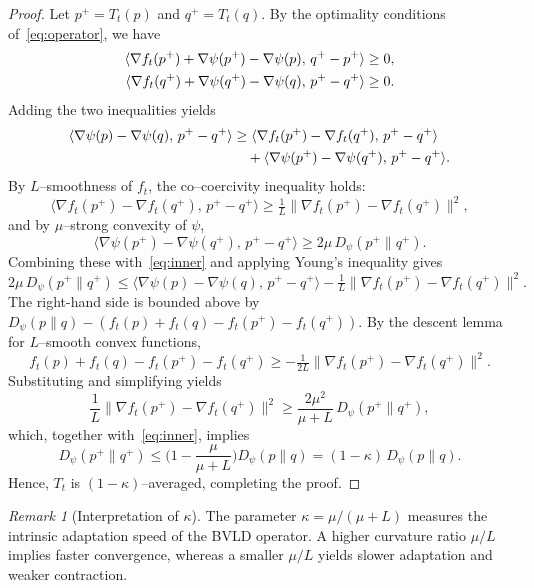 \documentclass[11pt]{article}
\theoremstyle{plain}
\theoremstyle{definition}
\theoremstyle{remark}
\newtheorem{remark}[theorem]{Remark}
\begin{document}
\begin{proof}
Let $p^+=T_t(p)$ and $q^+=T_t(q)$.  
By the optimality conditions of~\eqref{eq:operator}, we have
\begin{align}
\langle\nabla f_t(p^+)+\nabla\psi(p^+)-\nabla\psi(p),\,q^+-p^+\rangle &\ge 0, \notag\\
\langle\nabla f_t(q^+)+\nabla\psi(q^+)-\nabla\psi(q),\,p^+-q^+\rangle &\ge 0. 
\label{eq:opt-conditions}
\end{align}
Adding the two inequalities yields
\begin{align}
\langle\nabla\psi(p)-\nabla\psi(q),\,p^+-q^+\rangle
&\ge
\langle\nabla f_t(p^+)-\nabla f_t(q^+),\,p^+-q^+\rangle \notag\\
&\quad
+\langle\nabla\psi(p^+)-\nabla\psi(q^+),\,p^+-q^+\rangle.
\label{eq:inner}
\end{align}
By $L$--smoothness of $f_t$, the co--coercivity inequality holds:
\[
\langle\nabla f_t(p^+)-\nabla f_t(q^+),\,p^+-q^+\rangle
\ge \tfrac{1}{L}\|\nabla f_t(p^+)-\nabla f_t(q^+)\|^2,
\]
and by $\mu$--strong convexity of $\psi$,
\[
\langle\nabla\psi(p^+)-\nabla\psi(q^+),\,p^+-q^+\rangle
\ge 2\mu\,D_\psi(p^+\|q^+).
\]
Combining these with~\eqref{eq:inner} and applying Young’s inequality gives
\[
2\mu\,D_\psi(p^+\|q^+)
\le
\langle\nabla\psi(p)-\nabla\psi(q),\,p^+-q^+\rangle
-\tfrac{1}{L}\|\nabla f_t(p^+)-\nabla f_t(q^+)\|^2.
\]
The right-hand side is bounded above by 
$D_\psi(p\|q)-(f_t(p)+f_t(q)-f_t(p^+)-f_t(q^+))$.
By the descent lemma for $L$--smooth convex functions,
\[
f_t(p)+f_t(q)-f_t(p^+)-f_t(q^+)
\ge -\tfrac{1}{2L}\|\nabla f_t(p^+)-\nabla f_t(q^+)\|^2.
\]
Substituting and simplifying yields
\[
\frac{1}{L}\|\nabla f_t(p^+)-\nabla f_t(q^+)\|^2
\ge \frac{2\mu^2}{\mu+L}\,D_\psi(p^+\|q^+),
\]
which, together with~\eqref{eq:inner}, implies
\[
D_\psi(p^+\|q^+)
\le \Big(1-\frac{\mu}{\mu+L}\Big)D_\psi(p\|q)
=(1-\kappa)\,D_\psi(p\|q).
\]
Hence, $T_t$ is $(1-\kappa)$--averaged, completing the proof.
\end{proof}

\begin{remark}[Interpretation of $\kappa$]
\label{rem:kappa}
The parameter $\kappa=\mu/(\mu+L)$ measures the 
intrinsic adaptation speed of the BVLD operator.  
A higher curvature ratio $\mu/L$ implies faster convergence, 
whereas a smaller $\mu/L$ yields slower adaptation and weaker contraction.
\end{remark}
\end{document}
